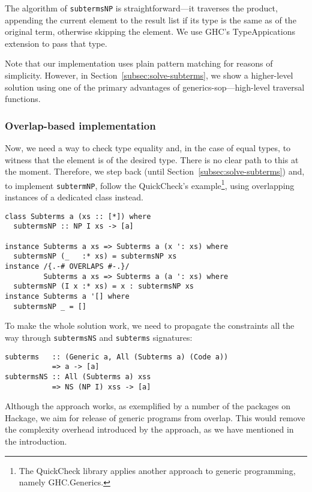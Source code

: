 \documentclass[runningheads]{llncs}
\newcommand{\K}[1]{\lstinline[style=fancy]{#1}}
\begin{document}
The algorithm of \K{subtermsNP} is straightforward---it traverses the product, appending the current element to the result list if its type is the same as of the original term, otherwise skipping the element. We use GHC's \textsf{TypeAppications} extension to pass that type.

Note that our implementation uses plain pattern matching for reasons of simplicity. However, in Section~\ref{subsec:solve-subterms}, we show a higher-level solution using one of the primary advantages of \textsf{generics-sop}---high-level traversal functions.

\subsubsection{Overlap-based implementation}

Now, we need a way to check type equality and, in the case of equal types, to witness that the element is of the desired type. There is no clear path to this at the moment. Therefore, we step back (until Section~\ref{subsec:solve-subterms}) and, to implement \K{subtermNP}, follow the \textsf{QuickCheck}'s example\footnote{The \textsf{QuickCheck} library applies another approach to generic programming, namely \textsf{GHC.Generics}.}, using overlapping instances of a dedicated class instead.
\begin{lstlisting}[style=fancy]
class Subterms a (xs :: [*]) where
  subtermsNP :: NP I xs -> [a]

instance Subterms a xs => Subterms a (x ': xs) where
  subtermsNP (_   :* xs) = subtermsNP xs
instance /{.-# OVERLAPS #-.}/
         Subterms a xs => Subterms a (a ': xs) where
  subtermsNP (I x :* xs) = x : subtermsNP xs
instance Subterms a '[] where
  subtermsNP _ = []
\end{lstlisting}

To make the whole solution work, we need to propagate the constraints all the way through \K{subtermsNS} and \K{subterms} signatures:
\begin{lstlisting}[style=fancy]
subterms   :: (Generic a, All (Subterms a) (Code a))
           => a -> [a]
subtermsNS :: All (Subterms a) xss
           => NS (NP I) xss -> [a]
\end{lstlisting}

Although the approach works, as exemplified by a number of the packages on Hackage, we aim for release of generic programs from overlap. This would remove the complexity overhead introduced by the approach, as we have mentioned in the introduction.
\end{document}

